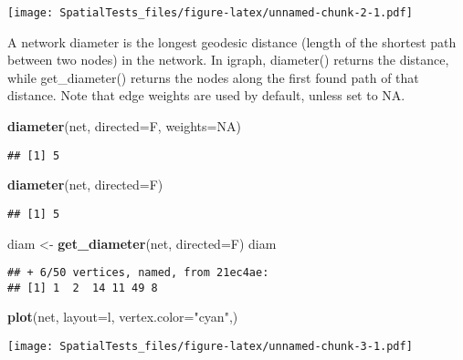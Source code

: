 \documentclass[]{article}
\newenvironment{Shaded}{\begin{snugshade}}{\end{snugshade}}
\newcommand{\DataTypeTok}[1]{\textcolor[rgb]{0.13,0.29,0.53}{#1}}
\newcommand{\KeywordTok}[1]{\textcolor[rgb]{0.13,0.29,0.53}{\textbf{#1}}}
\newcommand{\NormalTok}[1]{#1}
\newcommand{\OtherTok}[1]{\textcolor[rgb]{0.56,0.35,0.01}{#1}}
\newcommand{\StringTok}[1]{\textcolor[rgb]{0.31,0.60,0.02}{#1}}
\begin{document}
\texttt{[image: SpatialTests\_files/figure-latex/unnamed-chunk-2-1.pdf]}

A network diameter is the longest geodesic distance (length of the
shortest path between two nodes) in the network. In igraph, diameter()
returns the distance, while get\_diameter() returns the nodes along the
first found path of that distance. Note that edge weights are used by
default, unless set to NA.

\begin{Shaded}
\begin{Highlighting}[]
\KeywordTok{diameter}\NormalTok{(net, }\DataTypeTok{directed=}\NormalTok{F, }\DataTypeTok{weights=}\OtherTok{NA}\NormalTok{)}
\end{Highlighting}
\end{Shaded}

\begin{verbatim}
## [1] 5
\end{verbatim}

\begin{Shaded}
\begin{Highlighting}[]
\KeywordTok{diameter}\NormalTok{(net, }\DataTypeTok{directed=}\NormalTok{F)}
\end{Highlighting}
\end{Shaded}

\begin{verbatim}
## [1] 5
\end{verbatim}

\begin{Shaded}
\begin{Highlighting}[]
\NormalTok{diam <-}\StringTok{ }\KeywordTok{get_diameter}\NormalTok{(net, }\DataTypeTok{directed=}\NormalTok{F)}
\NormalTok{diam}
\end{Highlighting}
\end{Shaded}

\begin{verbatim}
## + 6/50 vertices, named, from 21ec4ae:
## [1] 1  2  14 11 49 8
\end{verbatim}

\begin{Shaded}
\begin{Highlighting}[]
\KeywordTok{plot}\NormalTok{(net, }\DataTypeTok{layout=}\NormalTok{l, }\DataTypeTok{vertex.color=}\StringTok{"cyan"}\NormalTok{,)}
\end{Highlighting}
\end{Shaded}

\texttt{[image: SpatialTests\_files/figure-latex/unnamed-chunk-3-1.pdf]}
\end{document}
